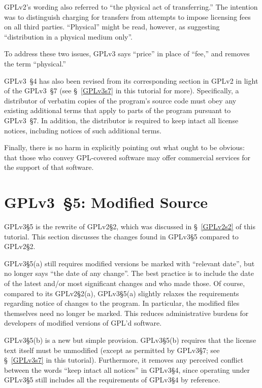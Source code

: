 GPLv2's wording also referred to ``the physical act of transferring.''  The
intention was to distinguish charging for transfers from attempts to impose
licensing fees on all third parties.  ``Physical'' might be read, however, as
suggesting ``distribution in a physical medium only''.

To address these two issues, GPLv3 says ``price'' in place of ``fee,'' and
removes the term ``physical.''

GPLv3~\S4 has also been revised from its corresponding section in GPLv2 in
light of the GPLv3~\S7 (see \S~\ref{GPLv3s7} in this tutorial for more).
Specifically, a distributor of verbatim copies of the program's source code
must obey any existing additional terms that apply to parts of the program
pursuant to GPLv3~\S7.  In addition, the distributor is required to keep
intact all license notices, including notices of such additional terms.

Finally, there is no harm in explicitly pointing out what ought to be
obvious: that those who convey GPL-covered software may offer commercial
services for the support of that software.

\section{GPLv3~\S5: Modified Source}
\label{GPLv3s5}

GPLv3\S5 is the rewrite of GPLv2\S2, which was discussed in \S~\ref{GPLv2s2}
of this tutorial.  This section discusses the changes found in GPLv3\S5
compared to GPLv2\S2.

GPLv3\S5(a) still requires modified versions be marked with ``relevant
date'', but no longer says ``the date of any change''.  The best practice is
to include the date of the latest and/or most significant changes and who
made those.  Of course, compared to its GPLv2\S2(a), GPLv3\S5(a) slightly
relaxes the requirements regarding notice of changes to the program.  In
particular, the modified files themselves need no longer be marked.  This
reduces administrative burdens for developers of modified versions of GPL'd
software.

GPLv3\S5(b) is a new but simple provision. GPLv3\S5(b)  requires that the
license text itself must be unmodified (except as permitted by GPLv3\S7; see
\S~\ref{GPLv3s7} in this tutorial).  Furthermore, it  removes any perceived
conflict between the words ``keep intact all notices'' in GPLv3\S4, since
operating under GPLv3\S5 still includes all the requirements of GPLv3\S4 by
reference.

